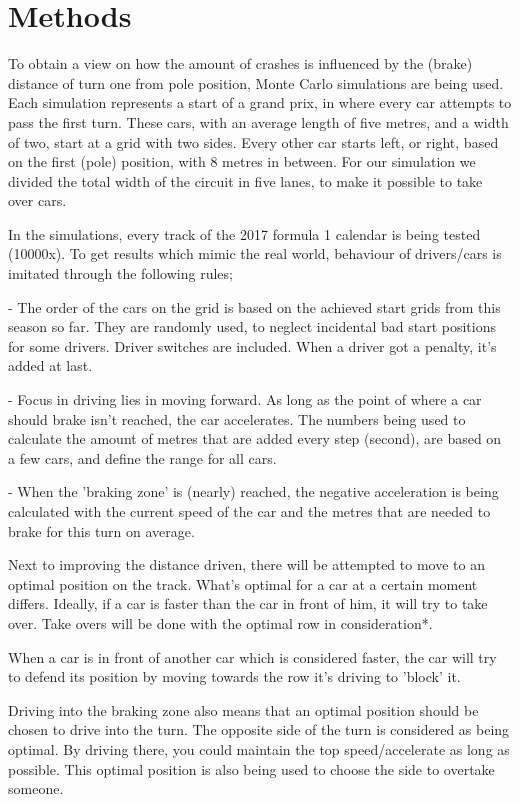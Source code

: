 \documentclass{article}
\begin{document}
\section{Methods}

To obtain a view on how the amount of crashes is influenced by the (brake) distance of turn one from pole position, Monte Carlo simulations are being used. Each simulation represents a start of a grand prix, in where every car attempts to pass the first turn. These cars, with an average length of five metres, and a width of two, start at a grid with two sides. Every other car starts left, or right, based on the first (pole) position, with 8 metres in between. For our simulation we divided the total width of the circuit in five lanes, to make it possible to take over cars.

In the simulations, every track of the 2017 formula 1 calendar is being tested (10000x). To get results which mimic the real world, behaviour of drivers/cars is imitated through the following rules;

- The order of the cars on the grid is based on the achieved start grids from this season so far. They are randomly used, to neglect incidental bad start positions for some drivers. Driver switches are included. When a driver got a penalty, it's added at last.

- Focus in driving lies in moving forward. As long as the point of where a car should brake isn't reached, the car accelerates. The numbers being used to calculate the amount of metres that are added every step (second), are based on a few cars, and define the range for all cars.

- When the 'braking zone' is (nearly) reached, the negative acceleration is being calculated with the current speed of the car and the metres that are needed to brake for this turn on average.

Next to improving the distance driven, there will be attempted to move to an optimal position on the track. What's optimal for a car at a certain moment differs. Ideally, if a car is faster than the car in front of him, it will try to take over. Take overs will be done with the optimal row in consideration*.

When a car is in front of another car which is considered faster, the car will try to defend its position by moving towards the row it's driving to 'block' it.

Driving into the braking zone also means that an optimal position should be chosen to drive into the turn. The opposite side of the turn is considered as being optimal. By driving there, you could maintain the top speed/accelerate as long as possible. This optimal position is also being used to choose the side to overtake someone.
\end{document}
